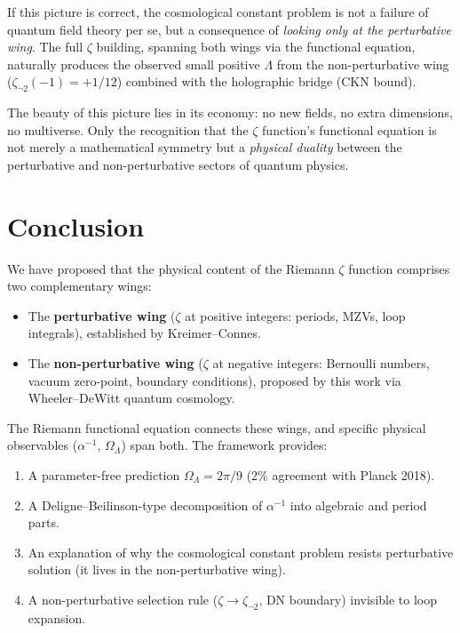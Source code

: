 \documentclass[11pt,a4paper]{article}
\begin{document}
If this picture is correct, the cosmological constant problem is
not a failure of quantum field theory per se, but a consequence
of \emph{looking only at the perturbative wing}. The full $\zeta$
building, spanning both wings via the functional equation,
naturally produces the observed small positive $\Lambda$ from
the non-perturbative wing ($\zeta_{\neg 2}(-1) = +1/12$) combined
with the holographic bridge (CKN bound).

The beauty of this picture lies in its economy: no new fields,
no extra dimensions, no multiverse. Only the recognition that
the $\zeta$ function's functional equation is not merely a
mathematical symmetry but a \emph{physical duality} between the
perturbative and non-perturbative sectors of quantum physics.

\section{Conclusion}

We have proposed that the physical content of the Riemann $\zeta$
function comprises two complementary wings:

\begin{itemize}
\item The \textbf{perturbative wing} ($\zeta$ at positive
integers: periods, MZVs, loop integrals), established by
Kreimer--Connes.
\item The \textbf{non-perturbative wing} ($\zeta$ at negative
integers: Bernoulli numbers, vacuum zero-point, boundary
conditions), proposed by this work via Wheeler--DeWitt quantum
cosmology.
\end{itemize}

The Riemann functional equation connects these wings, and specific
physical observables ($\alpha^{-1}$, $\Omega_\Lambda$) span both.
The framework provides:
\begin{enumerate}
\item A parameter-free prediction $\Omega_\Lambda = 2\pi/9$
(2\% agreement with Planck 2018).
\item A Deligne--Beilinson-type decomposition of $\alpha^{-1}$
into algebraic and period parts.
\item An explanation of why the cosmological constant problem
resists perturbative solution (it lives in the non-perturbative
wing).
\item A non-perturbative selection rule ($\zeta \to \zeta_{\neg 2}$,
DN boundary) invisible to loop expansion.
\end{enumerate}
\end{document}
